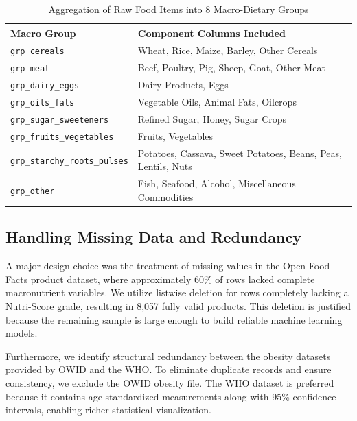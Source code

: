 \documentclass[10pt, a4paper]{article}
\begin{document}
\begin{table}[h]
\centering
\caption{Aggregation of Raw Food Items into 8 Macro-Dietary Groups}
\label{tab:macro_groups}
\small
\begin{tabular}{ll}
\toprule
\textbf{Macro Group} & \textbf{Component Columns Included} \\
\midrule
\texttt{grp\_cereals} & \parbox{11cm}{\strut Wheat, Rice, Maize, Barley, Other Cereals\strut} \\
\texttt{grp\_meat} & \parbox{11cm}{\strut Beef, Poultry, Pig, Sheep, Goat, Other Meat\strut} \\
\texttt{grp\_dairy\_eggs} & \parbox{11cm}{\strut Dairy Products, Eggs\strut} \\
\texttt{grp\_oils\_fats} & \parbox{11cm}{\strut Vegetable Oils, Animal Fats, Oilcrops\strut} \\
\texttt{grp\_sugar\_sweeteners} & \parbox{11cm}{\strut Refined Sugar, Honey, Sugar Crops\strut} \\
\texttt{grp\_fruits\_vegetables} & \parbox{11cm}{\strut Fruits, Vegetables\strut} \\
\texttt{grp\_starchy\_roots\_pulses} & \parbox{11cm}{\strut Potatoes, Cassava, Sweet Potatoes, Beans, Peas, Lentils, Nuts\strut} \\
\texttt{grp\_other} & \parbox{11cm}{\strut Fish, Seafood, Alcohol, Miscellaneous Commodities\strut} \\
\bottomrule
\end{tabular}
\end{table}

\subsection{Handling Missing Data and Redundancy}
A major design choice was the treatment of missing values in the Open Food Facts product dataset, where approximately 60\% of rows lacked complete macronutrient variables. We utilize listwise deletion for rows completely lacking a Nutri-Score grade, resulting in 8,057 fully valid products. This deletion is justified because the remaining sample is large enough to build reliable machine learning models.

Furthermore, we identify structural redundancy between the obesity datasets provided by OWID and the WHO. To eliminate duplicate records and ensure consistency, we exclude the OWID obesity file. The WHO dataset is preferred because it contains age-standardized measurements along with 95\% confidence intervals, enabling richer statistical visualization.
\end{document}
